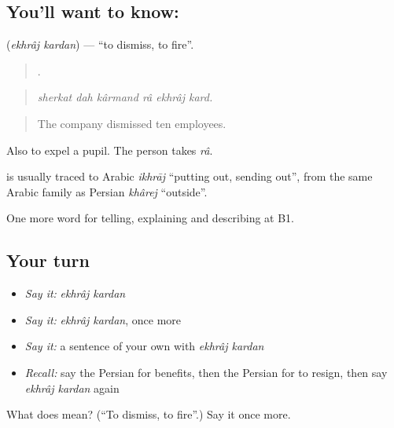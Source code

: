 \subsection*{You'll want to know:  }
\textbf{ } (\emph{ekhrâj kardan}) — \textquotedblleft{}to dismiss, to fire\textquotedblright{}.

\begin{quote}
     .
\end{quote}

\begin{quote}
\emph{sherkat dah kârmand râ ekhrâj kard.}
\end{quote}

\begin{quote}
The company dismissed ten employees.
\end{quote}

Also to expel a pupil. The person takes \emph{râ}.

\begin{cousinweb}
\textbf{} is usually traced to Arabic \emph{ikhrāj} \textquotedblleft{}putting out, sending out\textquotedblright{}, from the same Arabic family as Persian \emph{khârej} \textquotedblleft{}outside\textquotedblright{}.
\end{cousinweb}

\begin{grammarlens}[title={What you've built}]
One more word for telling, explaining and describing at B1.
\end{grammarlens}

\subsection*{Your turn}
\begin{itemize}
\raggedright
  \item \emph{Say it:} \emph{ekhrâj kardan}
  \item \emph{Say it:} \emph{ekhrâj kardan}, once more
  \item \emph{Say it:} a sentence of your own with \emph{ekhrâj kardan}
  \item \emph{Recall:} say the Persian for benefits, then the Persian for to resign, then say \emph{ekhrâj kardan} again
\end{itemize}

\begin{tcolorbox}[breakable,colback=teal!4,colframe=teal!35!black,title={Before you move on}]
What does   mean? (\textquotedblleft{}To dismiss, to fire\textquotedblright{}.) Say it once more.
\end{tcolorbox}
